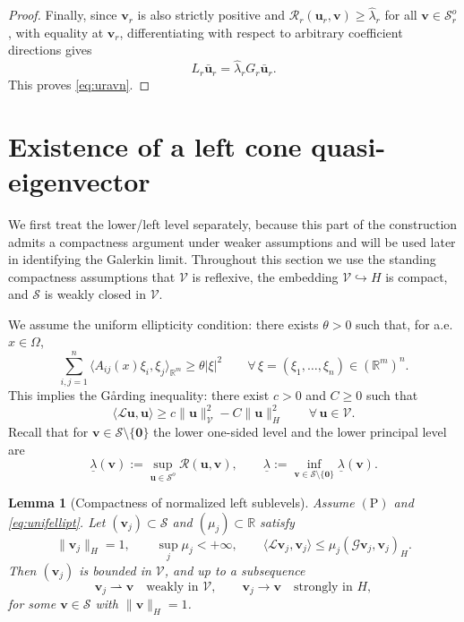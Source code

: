 \documentclass[preprint,10pt]{elsarticle}
\theoremstyle{plain}
\newtheorem{lemma}{Lemma}
\theoremstyle{definition}
\theoremstyle{remark}
\begin{document}
\begin{proof}
	Finally, since $\mathbf{v}_r$ is also strictly positive and
	$\mathcal{R}_r(\mathbf{u}_r,\mathbf{v})\ge\hat\lambda_r$ for all
	$\mathbf v\in\mathcal S_r^o$, with equality at $\mathbf v_r$, differentiating
	with respect to arbitrary coefficient directions gives
	\[
	L_r\bar{\mathbf{u}}_r=\hat\lambda_r G_r\bar{\mathbf{u}}_r.
	\]
	This proves \eqref{eq:uravn}.
\end{proof}


\section{Existence of a left cone quasi-eigenvector}
\label{sec:left-minimax-attainment}

We first treat the lower/left level separately, because this part of the
construction admits a compactness argument under weaker assumptions and will
be used later in identifying the Galerkin limit. Throughout this section we
use the standing compactness assumptions that $\mathcal V$ is reflexive, the
embedding $\mathcal V\hookrightarrow H$ is compact, and $\mathcal S$ is weakly
closed in $\mathcal V$.

We assume the uniform ellipticity condition: there exists $\theta>0$ such that,
for a.e.\ $x\in\Omega$,
\begin{equation}\label{eq:unifellipt}
	\sum_{i,j=1}^n
	\langle A_{ij}(x)\xi_i,\xi_j\rangle_{\mathbb{R}^m}
	\ge \theta|\xi|^2
	\qquad
	\forall\,\xi=(\xi_1,\ldots,\xi_n)\in(\mathbb{R}^m)^n.
\end{equation}
This implies the G{\aa}rding inequality: there exist $c>0$ and $C\ge0$ such that
\[
\langle\mathcal{L}\mathbf{u},\mathbf{u}\rangle
\ge c\|\mathbf{u}\|_{\mathcal{V}}^2 - C\|\mathbf{u}\|_H^2
\qquad
\forall\,\mathbf{u}\in\mathcal{V}.
\]
Recall that for $\mathbf{v}\in\mathcal{S}\setminus\{\mathbf{0}\}$ the lower
one-sided level and the lower principal level are
\[
\underline\lambda(\mathbf{v})
:= \sup_{\mathbf{u}\in\mathcal{S}^o}\mathcal{R}(\mathbf{u},\mathbf{v}),
\qquad
\underline\lambda
:= \inf_{\mathbf{v}\in\mathcal{S}\setminus\{\mathbf{0}\}}\underline\lambda(\mathbf{v}).
\]

\begin{lemma}[Compactness of normalized left sublevels]
	\label{lem:left-sublevel-compactness}
	Assume $\mathrm{(P)}$ and \eqref{eq:unifellipt}. Let
	$(\mathbf{v}_j)\subset\mathcal{S}$ and $(\mu_j)\subset\mathbb{R}$ satisfy
	\[
	\|\mathbf{v}_j\|_H=1,
	\qquad \sup_j\mu_j<+\infty,
	\qquad
	\langle\mathcal{L}\mathbf{v}_j,\mathbf{v}_j\rangle
	\le \mu_j(\mathcal{G}\mathbf{v}_j,\mathbf{v}_j)_H.
	\]
	Then $(\mathbf{v}_j)$ is bounded in $\mathcal{V}$, and up to a subsequence
	\[
	\mathbf{v}_j\rightharpoonup\mathbf{v}
	\quad\text{weakly in }\mathcal{V},
	\qquad
	\mathbf{v}_j\to\mathbf{v}
	\quad\text{strongly in }H,
	\]
	for some $\mathbf{v}\in\mathcal{S}$ with $\|\mathbf{v}\|_H=1$.
\end{lemma}
\end{document}
